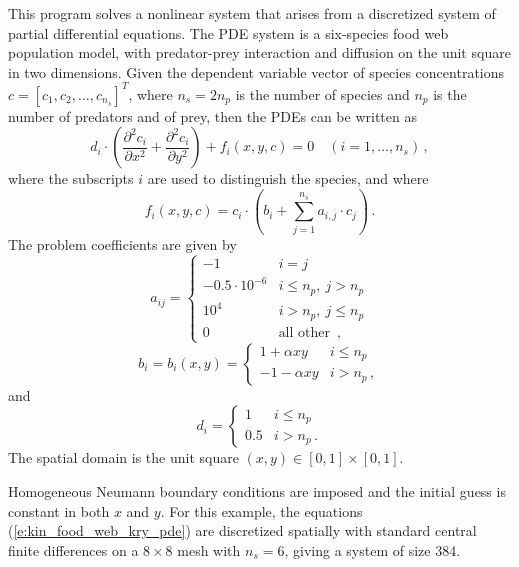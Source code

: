 This program solves a nonlinear system that arises from a discretized system of partial
differential equations. The PDE system is a six-species food web population
model, with predator-prey interaction and diffusion on the unit square in
two dimensions. Given the dependent variable vector of species concentrations
$c = [c_1, c_2,..., c_{n_s}]^T$, where $n_s = 2 n_p$ is the number of species 
and $n_p$ is the number of predators and of prey, then
the PDEs can be written as
\begin{equation}\label{e:kin_food_web_kry_pde}
  d_i \cdot \left( \frac{\partial^2 c_i}{\partial x^2} + 
    \frac{\partial^2 c_i}{\partial y^2} \right) + f_i(x,y,c) = 0
  \quad (i=1,...,n_s) \, ,
\end{equation}
where the subscripts $i$ are used to distinguish the species, and where
\begin{equation}\label{e:kin_food_web_kry_fterm}
f_i(x,y,c) = c_i \cdot \left(b_i + \sum_{j=1}^{n_s} a_{i,j} \cdot c_j \right) \, .
\end{equation}
The problem coefficients are given by
\begin{equation*}
  a_{ij} = 
  \begin{cases}
    -1                 & i=j \\
    -0.5 \cdot 10^{-6} & i \leq n_p , ~ j > n_p  \\
    10^4               & i > n_p , ~ j \leq n_p  \\
    0                  & \mbox{all other } \, ,
  \end{cases}
\end{equation*}
\begin{equation*}
  b_i = b_i(x,y) = 
  \begin{cases}
    1 + \alpha xy   & i \leq n_p  \\
    -1 - \alpha xy   & i > n_p \, ,
  \end{cases}
\end{equation*}
and
\begin{equation*}
  d_i = 
  \begin{cases}
    1 & i \leq n_p  \\
    0.5 & i > n_p  \, .
  \end{cases}
\end{equation*}
The spatial domain is the unit square $(x,y) \in [0,1] \times [0,1]$.

Homogeneous Neumann boundary conditions are imposed and the initial
guess is constant in both $x$ and $y$. For this example, the equations
(\ref{e:kin_food_web_kry_pde}) are discretized spatially with standard central finite
differences on a $8 \times 8$ mesh with $n_s = 6$, giving a system of size $384$.

